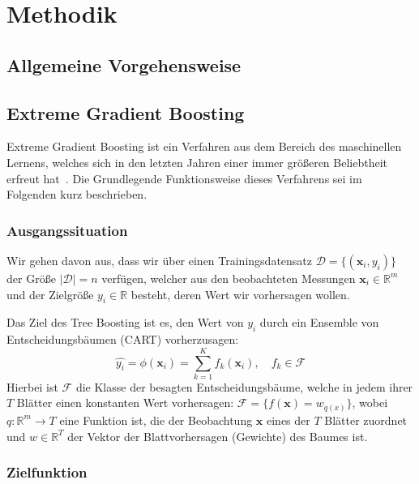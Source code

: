\section{Methodik}

\subsection{Allgemeine Vorgehensweise}

\subsection{Extreme Gradient Boosting}

Extreme Gradient Boosting ist ein Verfahren aus dem Bereich des maschinellen Lernens, welches sich
in den letzten Jahren einer immer gr\"o{\ss}eren Beliebtheit erfreut hat~\cite{XGBoost}.
Die Grundlegende Funktionsweise dieses Verfahrens sei im Folgenden kurz beschrieben.

\subsubsection{Ausgangssituation}

Wir gehen davon aus, dass wir \"uber einen Trainingsdatensatz $\mathcal{D} = \{(\mathbf{x}_i, y_i)\}$
der Gr\"o{\ss}e $\left| \mathcal{D} \right| = n$ verf\"ugen, welcher aus den beobachteten Messungen $\mathbf{x}_i \in \mathbb{R}^m$
und der Zielgr\"o{\ss}e $y_i \in \mathbb{R}$ besteht, deren Wert wir vorhersagen wollen.

Das Ziel des Tree Boosting ist es, den Wert von $y_i$ durch ein Ensemble von Entscheidungsb\"aumen (CART)
vorherzusagen:
\begin{equation}
    \hat{y_i} = \phi(\mathbf{x}_i) =  \sum_{k=1}^K f_k(\mathbf{x}_i), \quad f_k \in \mathcal{F}
\end{equation}
Hierbei ist $\mathcal{F}$ die Klasse der besagten Entscheidungsb\"aume, welche in jedem ihrer $T$ Bl\"atter
einen konstanten Wert vorhersagen: $\mathcal{F} = \{f(\mathbf{x}) = w_{q(x)}\}$, wobei $q: \mathbb{R}^m \rightarrow T$
eine Funktion ist, die der Beobachtung $\mathbf{x}$ eines der $T$ Bl\"atter zuordnet und $w \in \mathbb{R}^T$ der Vektor
der Blattvorhersagen (Gewichte) des Baumes ist.

\subsubsection{Zielfunktion}

